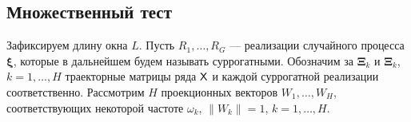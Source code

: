 \documentclass[specialist,
substylefile = spbu_report.rtx,
subf,href,colorlinks=true, 12pt]{disser}
\theoremstyle{definition}
\newtheorem{algorithm}{Алгоритм}
\newtheorem{remark}{Замечание}[section]
\begin{document}

\subsection{Множественный тест}\label{sect:multiple_test}
Зафиксируем длину окна $L$. Пусть $R_1, \ldots, R_G$ --- реализации случайного процесса $\bm\xi$, которые в дальнейшем будем называть суррогатными. Обозначим за $\bm\Xi_k$ и $\bm\Xi_k$, $k=1,\ldots, H$ траекторные матрицы ряда $\mathsf{X}$ и каждой суррогатной реализации соответственно. Рассмотрим $H$ проекционных векторов $W_1,\ldots,W_H$, соответствующих некоторой частоте $\omega_k$, $\|W_k\|=1$, $k=1,\ldots,H$.
\end{document}
